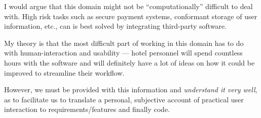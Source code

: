 I would argue that this domain might not be ``computationally'' difficult to
deal with. High risk tasks such as secure payment systems, conformant storage
of user information, etc., can is best solved by integrating third-party
software.

My theory is that the most difficult part of working in this domain has to do
with human-interaction and usability --- hotel personnel will spend countless
hours with the software and will definitely have a lot of ideas on how it could
be improved to streamline their workflow.

However, we must be provided with this information and \emph{understand it very
well}, as to facilitate us to translate a personal, subjective account of
practical user interaction to requirements/features and finally code.




% 
% 
% 
% 
% 
% 
% 
% 
% 
% 
% 
% 
% 
% 
% 
% 
% 
% 
% 
% 
